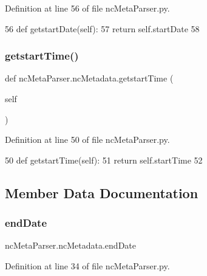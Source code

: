 Definition at line 56 of file nc\+Meta\+Parser.\+py.


\begin{DoxyCode}
56     \textcolor{keyword}{def }getstartDate(self):
57         \textcolor{keywordflow}{return} self.startDate
58     
\end{DoxyCode}
\mbox{\label{classnc_meta_parser_1_1nc_metadata_afe2e767476347158c9359cc8c5afef21}} 
\subsubsection{\texorpdfstring{getstart\+Time()}{getstartTime()}}
{\footnotesize\ttfamily def nc\+Meta\+Parser.\+nc\+Metadata.\+getstart\+Time (\begin{DoxyParamCaption}\item[{}]{self }\end{DoxyParamCaption})}



Definition at line 50 of file nc\+Meta\+Parser.\+py.


\begin{DoxyCode}
50     \textcolor{keyword}{def }getstartTime(self):
51         \textcolor{keywordflow}{return} self.startTime
52     
\end{DoxyCode}


\subsection{Member Data Documentation}
\mbox{\label{classnc_meta_parser_1_1nc_metadata_a846e0f0facf648d895d69b869a6e1fb0}} 
\subsubsection{\texorpdfstring{end\+Date}{endDate}}
{\footnotesize\ttfamily nc\+Meta\+Parser.\+nc\+Metadata.\+end\+Date}



Definition at line 34 of file nc\+Meta\+Parser.\+py.

